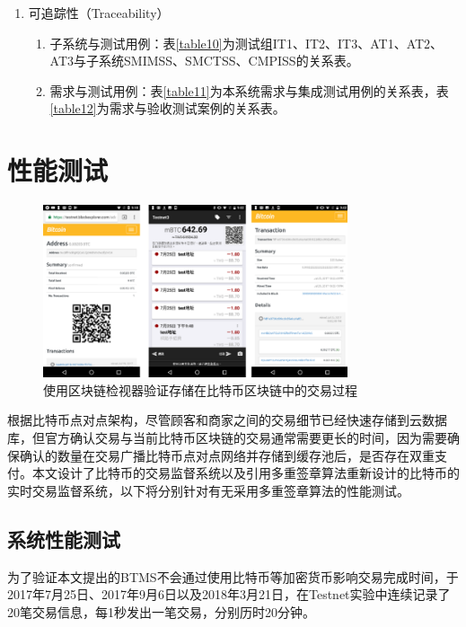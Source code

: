 \begin{enumerate}
			\item 可追踪性（Traceability）

						

			\begin{enumerate}
				\item 子系统与测试用例：表\ref{table10}为测试组IT1、IT2、IT3、AT1、AT2、AT3与子系统SMIMSS、SMCTSS、CMPISS的关系表。
				\item 需求与测试用例：表\ref{table11}为本系统需求与集成测试用例的关系表，表\ref{table12}为需求与验收测试案例的关系表。
				\end{enumerate}
		\end{enumerate}


	\section{性能测试}


		\begin{figure}[!htbp]
			\centering
			\includegraphics[width = 0.8\textwidth]{fig9.pdf}
			\caption{使用区块链检视器验证存储在比特币区块链中的交易过程}\label{fig9}
		\end{figure}


		根据比特币点对点架构，尽管顾客和商家之间的交易细节已经快速存储到云数据库，但官方确认交易与当前比特币区块链的交易通常需要更长的时间，因为需要确保确认的数量在交易广播比特币点对点网络并存储到缓存池后，是否存在双重支付。本文设计了比特币的交易监督系统以及引用多重签章算法重新设计的比特币的实时交易监督系统，以下将分别针对有无采用多重签章算法的性能测试。


		\subsection{系统性能测试}
		为了验证本文提出的BTMS不会通过使用比特币等加密货币影响交易完成时间，于2017年7月25日、2017年9月6日以及2018年3月21日，在Testnet实验中连续记录了20笔交易信息，每1秒发出一笔交易，分别历时20分钟。

